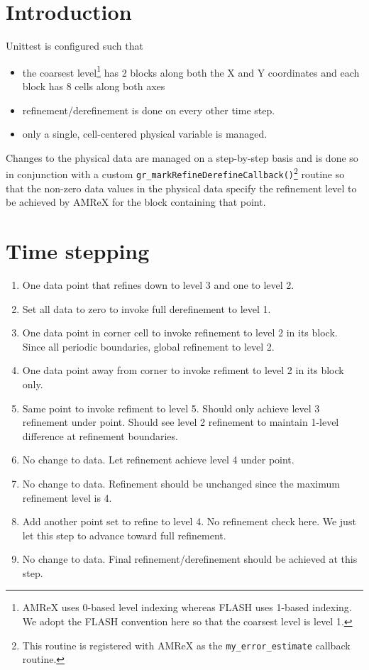 \documentclass[12pt,letterpaper]{article}
\begin{document}
\setlength{\parindent}{0pt}

\section{Introduction}
Unittest is configured such that
\begin{itemize}
\item{the coarsest level\footnote{AMReX uses 0-based level indexing whereas
FLASH uses 1-based indexing.  We adopt the FLASH convention here so that the coarsest
level is level 1.} has 2 blocks along both the X and Y
coordinates and each block has 8 cells along both axes}
\item{refinement/derefinement is done on every other time step.}
\item{only a single, cell-centered physical variable is managed.}
\end{itemize}

Changes to the physical data are managed on a step-by-step basis and is done so
in conjunction with a custom
\texttt{gr\_markRefineDerefineCallback()}\footnote{This routine is registered
with AMReX as the \texttt{my\_error\_estimate} callback routine.} routine so that the
non-zero data values in the physical data specify the refinement level to be
achieved by AMReX for the block containing that point.

\section{Time stepping}
\begin{enumerate}
\item[(Init)]{One data point that refines down to level 3 and one to level 2.}
\item[(Steps 1/2)]{Set all data to zero to invoke full derefinement to level 1.}
\item[(Steps 3/4)]{One data point in corner cell to invoke refinement to level 2 in
its block.  Since all periodic boundaries, global refinement to level 2.}
\item[(Steps 5/6)]{One data point away from corner to invoke refiment to level 2 in
its block only.}
\item[(Steps 7/8)]{Same point to invoke refiment to level 5.  Should only achieve
level 3 refinement under point.  Should see level 2
refinement to maintain 1-level difference at refinement boundaries.}
\item[(Steps 9/10)]{No change to data.  Let refinement achieve level 4 under
point.}
\item[(Steps 11/12)]{No change to data.  Refinement should be unchanged since
the maximum refinement level is 4.}
\item[(Steps 13/14)]{Add another point set to refine to level 4.  No refinement check
here.  We just let this step to advance toward full refinement.}
\item[(Steps 15/16)]{No change to data.  Final refinement/derefinement should be
achieved at this step.}
\end{enumerate}
\end{document}
